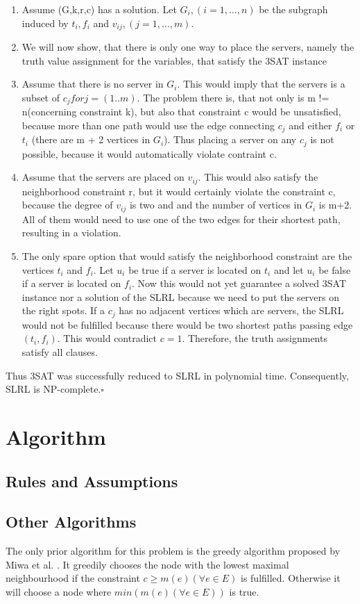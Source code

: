 \documentclass [12pt]{article}
\begin{document}
\begin{enumerate}
  \item{Assume (G,k,r,c) has a solution. Let $G_i, (i=1,\dots,n)$ be the subgraph induced
    by $t_i, f_i$ and $v_{ij},(j=1,\dots,m)$.}
  \item{We will now show, that there is only one way to place the servers, namely the truth
    value assignment for the variables, that satisfy the 3SAT instance}
  \item{Assume that there is no server in $G_i$. This would imply that the servers is a subset of
      $c_j for j=(1..m)$. The problem there is, that not only is m != n(concerning constraint k),
      but also that constraint c would be unsatisfied, because more than one path would use 
      the edge connecting $c_j$ and either $f_i$ or $t_i$ (there are m + 2 vertices in $G_i$).
    Thus placing a server on any $c_j$ is not possible, because it would automatically violate contraint c.}
  \item{Assume that the servers are placed on $v_{ij}$. This would also satisfy the neighborhood 
      constraint r, but it would certainly violate the constraint c, because the degree of $v_{ij}$ is two and
      and the number of vertices in $G_i$ is m+2. All of them would need to use one of the two edges for their shortest path,
    resulting in a violation.}
  \item{The only spare option that would satisfy the neighborhood constraint 
      are the vertices $t_i$ and $f_i$. Let $u_i$ be true if a server is located on
      $t_i$ and let $u_i$ be false if a server is located on $f_i$. Now this would not yet 
      guarantee a solved 3SAT instance nor a solution of the SLRL because we need to put
      the servers on the right spots. If a $c_j$ has no adjacent vertices which are servers,
      the SLRL would not be fulfilled because there would be two shortest paths passing edge
      $(t_i,f_i)$. This would contradict $c = 1$. Therefore, the truth assignments satisfy all
    clauses.}
\end{enumerate}
Thus 3SAT was successfully reduced to SLRL in polynomial time.
Consequently, SLRL is NP-complete.$\square$
\section{Algorithm}
\subsection{Rules and Assumptions}
\subsection{Other Algorithms}
The only prior algorithm for this problem is the greedy algorithm proposed by
Miwa et al. \cite{mirrorserver}. It greedily chooses the node with the 
lowest maximal neighbourhood if the constraint $c\geq m(e) (\forall e \in E)$ is fulfilled. 
Otherwise it will choose a node where $min(m(e)(\forall e \in E))$ is true.
\end{document}
